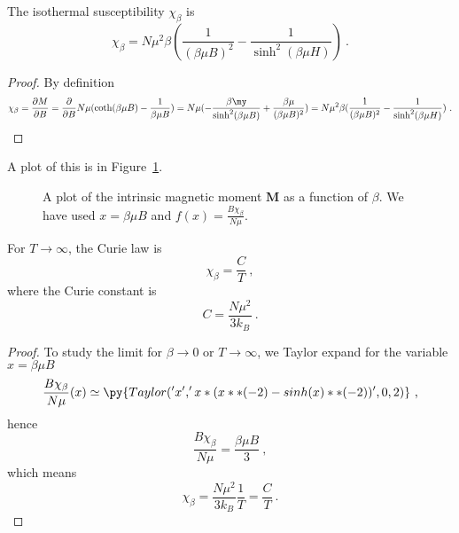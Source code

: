     The isothermal susceptibility $\chi_\beta$ is 
    \begin{equation*}
        \chi_\beta = N \mu^2 \beta ( \frac{1}{(\beta \mu B)^2} - \frac{1}{\sinh^2 (\beta \mu H)}) ~.
    \end{equation*}
    \begin{proof}
        By definition
        \begin{equation*}
            \chi_\beta = \pdv{M}{B} = \pdv{}{B} N\mu (\coth(\beta \mu B) - \frac{1}{\beta \mu B}) = N \mu ( - \frac{\beta \my}{\sinh^2 (\beta \mu B)} + \frac{\beta \mu}{(\beta \mu B)^2} ) = N \mu^2 \beta ( \frac{1}{(\beta \mu B)^2} - \frac{1}{\sinh^2 (\beta \mu H)}) ~.
        \end{equation*}
    \end{proof}
    A plot of this is in Figure~\ref{can:sus}.
    \begin{figure}[h!]
        \centering
        \caption{A plot of the intrinsic magnetic moment $\mathbf M$ as a function of $\beta$. We have used $x = \beta \mu B$ and $f(x) = \frac{B \chi_\beta}{N \mu}$.}
        \label{can:sus}
    \end{figure}

    For $T \rightarrow \infty$, the Curie law is 
    \begin{equation*}
        \chi_\beta = \frac{C}{T} ~,
    \end{equation*}
    where the Curie constant is 
    \begin{equation*}
        C = \frac{N \mu^2}{3 k_B} ~.
    \end{equation*}
    \begin{proof}
        To study the limit for $\beta \rightarrow 0$ or $T \rightarrow \infty$, we Taylor expand for the variable $x = \beta \mu B$
        \begin{equation*}
            \frac{B \chi_\beta}{N \mu} (x) \simeq \py{Taylor('x', 'x * ( x**(-2) - sinh(x)**(-2))', 0, 2)} ~,
        \end{equation*}
        hence 
        \begin{equation*}
            \frac{B \chi_\beta}{N \mu} = \frac{\beta \mu B}{3} ~,
        \end{equation*}
        which means 
        \begin{equation*}
            \chi_\beta = \frac{N \mu^2}{3 k_B} \frac{1}{T} = \frac{C}{T} ~.
        \end{equation*}
    \end{proof}

